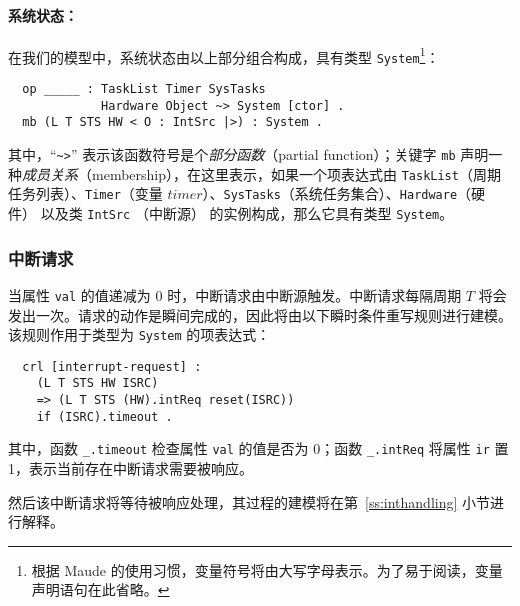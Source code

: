\paragraph{系统状态：} 在我们的模型中，系统状态由以上部分组合构成，具有类型 \verb|System|\footnote{根据 Maude 的使用习惯，变量符号将由大写字母表示。为了易于阅读，变量声明语句在此省略。}：
\begin{verbatim}
  op _____ : TaskList Timer SysTasks 
             Hardware Object ~> System [ctor] .
  mb (L T STS HW < O : IntSrc |>) : System .
\end{verbatim}
其中，“\verb|~>|” 表示该函数符号是个\emph{部分函数}（partial function）；关键字 \verb|mb| 声明一种\emph{成员关系}（membership），在这里表示，如果一个项表达式由 \verb|TaskList|（周期任务列表）、\verb|Timer|（变量 $\mathit{timer}$）、\verb|SysTasks|（系统任务集合）、\verb|Hardware|（硬件） 以及类 \verb|IntSrc| （中断源） 的实例构成，那么它具有类型 \verb|System|。

\subsubsection{中断请求}
\label{ss:ir}

当属性 \verb|val| 的值递减为 0 时，中断请求由中断源触发。中断请求每隔周期 $T$ 将会发出一次。请求的动作是瞬间完成的，因此将由以下瞬时条件重写规则进行建模。该规则作用于类型为 \verb|System| 的项表达式：
\begin{verbatim}
  crl [interrupt-request] :
    (L T STS HW ISRC) 
    => (L T STS (HW).intReq reset(ISRC))
    if (ISRC).timeout .
\end{verbatim}
其中，函数 \verb|_.timeout| 检查属性 \verb|val| 的值是否为 0；函数 \verb|_.intReq| 将属性 \verb|ir| 置 1，表示当前存在中断请求需要被响应。

然后该中断请求将等待被响应处理，其过程的建模将在第~\ref{ss:inthandling} 小节进行解释。

